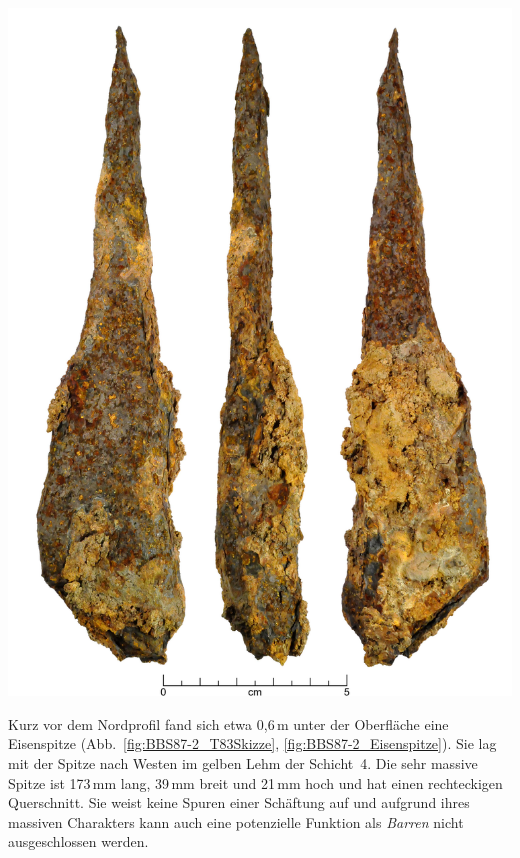 \begin{Figure}
	\centering
	\includegraphics[width=.95\columnwidth]{fig/BBS87-2-4_Eisenspitze.jpg}
	\label{fig:BBS87-2_Eisenspitze}
\end{Figure}

Kurz vor dem Nordprofil fand sich etwa 0,6\,m unter der Oberfläche eine Eisenspitze (Abb.~\ref{fig:BBS87-2_T83Skizze}, \ref{fig:BBS87-2_Eisenspitze}). Sie lag mit der Spitze nach Westen im gelben Lehm der Schicht~4. Die sehr massive Spitze ist 173\,mm lang, 39\,mm breit und 21\,mm hoch und hat einen rechteckigen Querschnitt. Sie weist keine Spuren einer Schäftung auf und aufgrund ihres massiven Charakters kann auch eine potenzielle Funktion als \textit{Barren} nicht ausgeschlossen werden.

